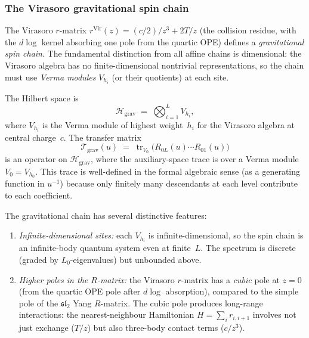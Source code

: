 \subsubsection{The Virasoro gravitational spin chain}

\begin{construction}
\label{constr:virasoro-spin-chain}
%
%
%
The Virasoro $r$-matrix $r^{\mathrm{Vir}}(z)
= (c/2)/z^3 + 2T/z$ (the collision residue, with the
$d\log$ kernel absorbing one pole from the quartic OPE)
defines a \emph{gravitational spin chain}. The fundamental
distinction from all affine chains is dimensional: the
Virasoro algebra has no finite-dimensional nontrivial
representations, so the chain must use \emph{Verma modules}
$V_{h_i}$ (or their quotients) at each site.

The Hilbert space is
\begin{equation}
\label{eq:virasoro-hilbert-space}
\mathcal{H}_{\mathrm{grav}}
\;=\;
\bigotimes_{i=1}^{L} V_{h_i},
\end{equation}
where $V_{h_i}$ is the Verma module of highest weight~$h_i$
for the Virasoro algebra at central charge~$c$. The transfer
matrix
\begin{equation}
\label{eq:virasoro-transfer-matrix}
\mathcal{T}_{\mathrm{grav}}(u)
\;=\;
\operatorname{tr}_{V_0}\!\bigl(
 R_{0L}(u) \cdots R_{01}(u)
\bigr)
\end{equation}
is an operator on $\mathcal{H}_{\mathrm{grav}}$, where
the auxiliary-space trace is over a Verma module $V_0 = V_{h_0}$.
This trace is well-defined in the formal algebraic sense
(as a generating function in $u^{-1}$) because only
finitely many descendants at each level contribute to
each coefficient.

The gravitational chain has several distinctive features:
\begin{enumerate}[label=\textup{(\roman*)}]
\item \emph{Infinite-dimensional sites:} each
 $V_{h_i}$ is infinite-dimensional, so the spin chain
 is an infinite-body quantum system even at finite~$L$.
 The spectrum is discrete (graded by $L_0$-eigenvalues)
 but unbounded above.

\item \emph{Higher poles in the $R$-matrix:}
 the Virasoro $r$-matrix has a \emph{cubic} pole at
 $z = 0$ (from the quartic OPE pole after $d\log$
 absorption), compared to the simple pole of the
 $\mathfrak{sl}_2$ Yang $R$-matrix. The cubic pole
 produces long-range interactions: the nearest-neighbour
 Hamiltonian $H = \sum_i r_{i,i+1}$ involves not just
 exchange ($T/z$) but also three-body contact terms
 ($c/z^3$).


\end{enumerate}
\end{construction}
